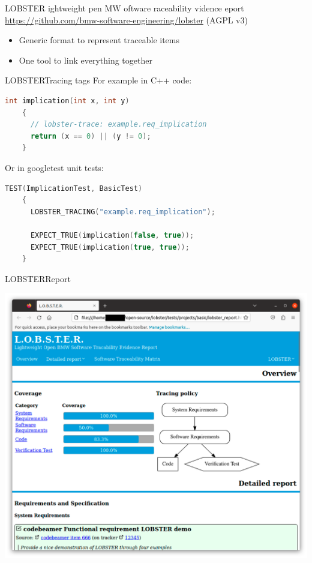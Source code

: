 \documentclass[aspectratio=169]{beamer}
\begin{document}
\begin{frame}{LOBSTER}
  ightweight pen MW
  oftware raceability vidence
  eport\\
  \url{https://github.com/bmw-software-engineering/lobster} (AGPL v3)
  \begin{itemize}
  \item Generic format to represent traceable items
  \item One tool to link everything together
  \end{itemize}
\end{frame}

\begin{frame}[fragile]{LOBSTER}{Tracing tags}
  For example in C++ code:
  \begin{lstlisting}[language=c++,gobble=4]
    int implication(int x, int y)
    {
      // lobster-trace: example.req_implication
      return (x == 0) || (y != 0);
    }
  \end{lstlisting}

  Or in googletest unit tests:
  \begin{lstlisting}[language=c++,gobble=4]
    TEST(ImplicationTest, BasicTest)
    {
      LOBSTER_TRACING("example.req_implication");

      EXPECT_TRUE(implication(false, true));
      EXPECT_TRUE(implication(true, true));
    }
  \end{lstlisting}
\end{frame}

\begin{frame}{LOBSTER}{Report}
  \begin{center}
    \includegraphics[height=0.8\textheight]{pictures/lobster.png}
  \end{center}
\end{frame}
\end{document}
